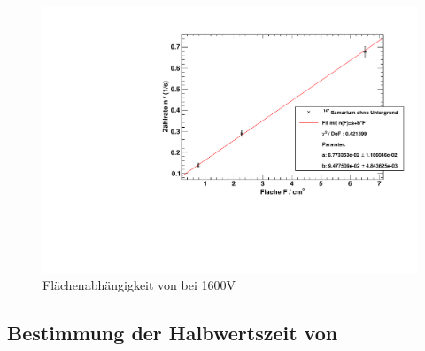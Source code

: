 \begin{figure}[H]
\begin{center}
  \includegraphics[width=15cm]{../img/Samarium147-Flaechenabhaengigkeit.pdf}
  \caption[Flächenabhängigkeit von \samarium]{Flächenabhängigkeit von \samarium bei 1600V}
  \label{figureLabel}
\end{center}
\end{figure}



\subsection{Bestimmung der Halbwertszeit von \kalium}
